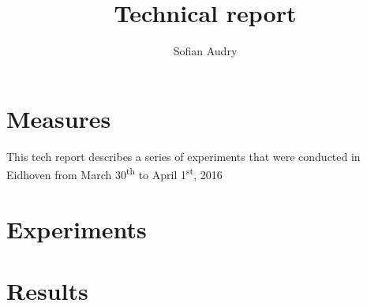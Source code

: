 \documentclass[a4paper,10pt]{article}
\title{Technical report}
\author{Sofian Audry}
\begin{document}
\maketitle

\begin{abstract}

\end{abstract}

\section{Measures}

This tech report describes a series of experiments that were conducted in Eidhoven from March 30\textsuperscript{th} to April 1\textsuperscript{st}, 2016
\citep{Richardson2012-Measuring}

\section{Experiments}

\section{Results}

 
\end{document}
